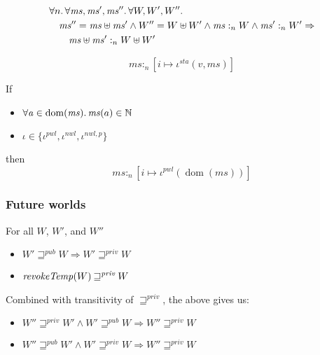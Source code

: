 \documentclass[a4paper]{article}
\DeclareMathOperator{\dom}{dom}
\newcommand{\var}[1]{\mathit{#1}}
\newcommand{\hs}{\var{ms}}
\newcommand{\ms}{\hs}
\newcommand{\addr}{\var{a}}
\newcommand{\heap}{\var{mem}}
\newcommand{\nwl}{\var{nwl}}
\newcommand{\pwl}{\var{pwl}}
\newcommand{\sta}{\var{sta}}
\newcommand{\futurewk}{\mathbin{\sqsupseteq}^{\var{pub}}}
\newcommand{\futurestr}{\mathbin{\sqsupseteq}^{\var{priv}}}
\newcommand{\heapSat}[3][\heap]{#1 :_{#2} #3}
\newcommand{\memSat}[3][n]{\heapSat[#2]{#1}{#3}}
\newcommand{\nats}{\mathbb{N}}
\begin{document}
\begin{lemma}
  \label{lem:disj-mem-sat}
  \begin{align*}
    & \forall n \ldotp \forall \ms, \ms', \ms'' \ldotp \forall W, W', W'' \ldotp\\
    & \quad \ms'' = \ms \uplus \ms' \land W'' = W \uplus W' \land \memSat{\ms}{W} \land \memSat{\ms'}{W'} \Rightarrow \\
    & \qquad \heapSat[\ms \uplus \ms' ]{n}{W \uplus W'}
  \end{align*}
\end{lemma}

\begin{lemma}
  \label{lem:mem-sat-static}
  \[
    \memSat{\ms}{[i \mapsto \iota^\sta(v,\ms)]}
  \]
\end{lemma}

\begin{lemma}
  \label{lem:mem-sat-data-only-std-regions}
  If
  \begin{itemize}
  \item $\forall \addr \in \dom(\ms)\ldotp \ms(a) \in \nats$
  \item $\iota \in \{\iota^\pwl,\iota^\nwl,\iota^{\nwl,p} \}$
  \end{itemize}
  then
  \[
    \memSat{\ms}{[i \mapsto \iota^\pwl(\dom(\ms))]}
  \]
\end{lemma}

\subsubsection{Future worlds}
\begin{lemma}
  For all $W$, $W'$, and $W''$
  \begin{itemize}
  \item $W' \futurewk W \Rightarrow W' \futurestr W$
  \item $\wrev{W} \futurestr W$
  \end{itemize}
  Combined with transitivity of $\futurestr$, the above gives us:
  \begin{itemize}
  \item $W'' \futurestr W' \land W' \futurewk W \Rightarrow W'' \futurestr W$
  \item $W'' \futurewk W' \land W' \futurestr W \Rightarrow W'' \futurestr W$
  \end{itemize}
\end{lemma}
\end{document}
